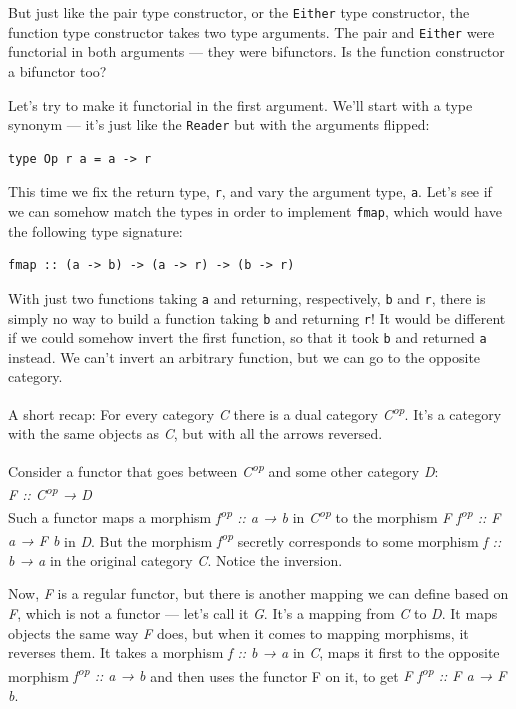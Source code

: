 But just like the pair type constructor, or the \texttt{Either} type
constructor, the function type constructor takes two type arguments. The
pair and \texttt{Either} were functorial in both arguments --- they were
bifunctors. Is the function constructor a bifunctor too?

Let's try to make it functorial in the first argument. We'll start with
a type synonym --- it's just like the \texttt{Reader} but with the
arguments flipped:

\begin{verbatim}
type Op r a = a -> r
\end{verbatim}

This time we fix the return type, \texttt{r}, and vary the argument
type, \texttt{a}. Let's see if we can somehow match the types in order
to implement \texttt{fmap}, which would have the following type
signature:

\begin{verbatim}
fmap :: (a -> b) -> (a -> r) -> (b -> r)
\end{verbatim}

With just two functions taking \texttt{a} and returning, respectively,
\texttt{b} and \texttt{r}, there is simply no way to build a function
taking \texttt{b} and returning \texttt{r}! It would be different if we
could somehow invert the first function, so that it took \texttt{b} and
returned \texttt{a} instead. We can't invert an arbitrary function, but
we can go to the opposite category.

A short recap: For every category \emph{C} there is a dual category
\emph{C\textsuperscript{op}}. It's a category with the same objects as
\emph{C}, but with all the arrows reversed.

Consider a functor that goes between \emph{C\textsuperscript{op}} and
some other category \emph{D}:\\
\emph{F :: C\textsuperscript{op} → D}\\
Such a functor maps a morphism \emph{f\textsuperscript{op} :: a → b} in
\emph{C\textsuperscript{op}} to the morphism \emph{F
f\textsuperscript{op} :: F a → F b} in \emph{D}. But the morphism
\emph{f\textsuperscript{op}} secretly corresponds to some morphism
\emph{f :: b → a} in the original category \emph{C}. Notice the
inversion.

Now, \emph{F} is a regular functor, but there is another mapping we can
define based on \emph{F}, which is not a functor --- let's call it
\emph{G}. It's a mapping from \emph{C} to \emph{D}. It maps objects the
same way \emph{F} does, but when it comes to mapping morphisms, it
reverses them. It takes a morphism \emph{f :: b → a} in \emph{C}, maps
it first to the opposite morphism \emph{f\textsuperscript{op} :: a → b}
and then uses the functor F on it, to get \emph{F f\textsuperscript{op}
:: F a → F b}.

